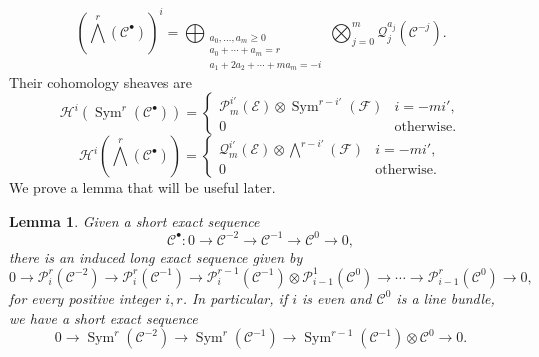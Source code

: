 \documentclass[11pt,letterpaper,reqno]{amsart}
\newcommand{\Sym}{\operatorname{Sym}}
\newcommand{\mc}[1]{\mathcal{#1}}
\def\lra{\longrightarrow}
\newtheorem{lemma}[theorem]{Lemma}
\theoremstyle{definition}
\numberwithin{equation}{section}
\begin{document}
\begin{equation}\label{eq:termsWedge}
    \left(\bigwedge^r(\mc{C}^\bullet)\right)^{i} = \bigoplus_{\substack{a_0,\dots,a_m \ge 0\\ a_0 + \cdots + a_m = r\\ a_1 + 2a_2 + \cdots + ma_m = -i}} \bigotimes_{j = 0}^m \mc{Q}^{a_j}_{j} (\mc{C}^{-j}).
\end{equation}
Their cohomology sheaves are
\begin{equation}\label{eq:cohomologySheavesSym}
    \mc{H}^i\left(\Sym^r(\mc{C}^\bullet)\right) = \begin{cases}
    \mc{P}_m^{i'}(\mc{E})\otimes \Sym^{r-i'}(\mc{F})& i = -mi',\\
    0& \text{otherwise}.
\end{cases}
\end{equation}
\begin{equation}\label{eq:cohomologySheavesWedge}
    \mc{H}^i\left(\bigwedge^r(\mc{C}^\bullet)\right) = \begin{cases}
    \mc{Q}_m^{i'}(\mc{E})\otimes \bigwedge^{r-i'}(\mc{F})& i = -mi',\\
    0& \text{otherwise}.
\end{cases}
\end{equation}
We prove a lemma that will be useful later.
\begin{lemma}\label{lem:lesSym}
    Given a short exact sequence
    \[\mc{C}^\bullet \colon 0 \lra \mc{C}^{-2} \lra \mc{C}^{-1} \lra \mc{C}^0 \lra 0,\]
    there is an induced long exact sequence given by
    \[0 \lra \mc{P}_i^r(\mc{C}^{-2}) \lra \mc{P}^{r}_i(\mc{C}^{-1}) \lra \mc{P}^{r-1}_i(\mc{C}^{-1}) \otimes \mc{P}^1_{i-1}(\mc{C}^0)\lra \cdots \lra \mc{P}^r_{i-1}(\mc{C}^0)\lra 0,\]
    for every positive integer $i,r$. In particular, if $i$ is even and $\mc{C}^0$ is a line bundle, we have a short exact sequence
    \[0 \lra \Sym^r(\mc{C}^{-2}) \lra \Sym^{r}(\mc{C}^{-1}) \lra \Sym^{r-1}(\mc{C}^{-1}) \otimes \mc{C}^0 \lra 0.\]
\end{lemma}
\end{document}
